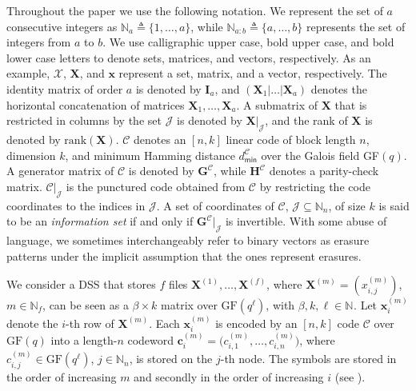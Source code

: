 \documentclass[twocolumn,conference]{IEEEtran}
\newcommand{\X}{\bm X}
\newcommand{\set}[1]{\mathcal{#1}}           %
\newcommand{\mat}[1]{\bm{#1}}                %
\newcommand{\vect}[1]{\bm{#1}}               %
\newcommand{\GF}{\mathrm{GF}}                %
\newcommand{\Nat}[1]{\mathbb{N}_{#1}}        %
\newcommand{\code}[1]{\mathcal{#1}}          %
\newcommand{\rank}[1]{\mathrm{rank}\left(#1\right)} %
\begin{document}
Throughout the paper we use the following notation. We represent the set of $a$ consecutive integers as $\Nat{a}\triangleq\{1,\ldots,a\}$, while $\Nat{a:b}\triangleq\{a,\ldots,b\}$ represents the set of integers from $a$ to $b$. We use calligraphic upper case, bold upper case, and bold lower case letters to denote sets, matrices, and vectors, respectively.  As an example, $\mathcal X$, $\bm X$, and $\bm x$ represent a set, matrix, and a vector, respectively. The identity matrix of order $a$ is denoted by $\bm I_a$, and  %
$(\bm X_1|\ldots|\bm X_a)$ denotes the horizontal concatenation of matrices $\bm X_1,\ldots,\bm X_a$.
A submatrix of $\bm X$ that is restricted in columns by the set $\mathcal J$ is denoted by $\bm X|_{\mathcal J}$, and the rank of $\bm X$ is denoted by $\rank{\bm X}$. $\mathcal C$ denotes an $[n,k]$ linear code of block length $n$, dimension $k$, and minimum Hamming distance $d_{\mathsf{min}}^{\mathcal C}$  over the Galois field GF$(q)$. A generator matrix of $\mathcal C$ is denoted by $\bm G^{\mathcal{C}}$, while $\bm H^{\mathcal{C}}$ denotes a parity-check matrix. $\mathcal C|_{\mathcal J}$ is the punctured code obtained from $\mathcal C$ by restricting the code coordinates to the indices in $\mathcal J$.  %
A set of coordinates of $\mathcal{C}$, $\set{J}\subseteq\Nat{n}$, of size $k$ is said to be an \emph{information set} if and
only if $\mat{G}^\code{C}|_\set{J}$ is invertible. With some abuse of language, we sometimes interchangeably refer to binary vectors as erasure patterns under the implicit assumption that the ones represent erasures.
%



We consider a DSS that stores $f$ files $\bm X^{(1)},\ldots, \bm X^{(f)}$, where 
$\bm{X}^{(m)}=(x_{i,j}^{(m)})$, $m\in\Nat{f}$, can be seen as a $\beta \times k$ matrix over $\GF(q^\ell)$,
with $\beta, k, \ell\in\Nat{}$. Let $\bm x^{(m)}_i$ denote the $i$-th row of $\X^{(m)}$. Each $\bm x_i^{(m)}$ is encoded by an $[n,k]$ code $\mathcal{C}$ over
$\GF(q)$ into a length-$n$ codeword
$\bm c^{(m)}_i=\bigl(c^{(m)}_{i,1},\ldots,c^{(m)}_{i,n}\bigr)$, where $c_{i,j}^{(m)}\in\GF(q^\ell)$, $j\in\Nat{n}$, is stored on the $j$-th node. The symbols are stored in the order of increasing $m$ and secondly in the order of increasing $i$ (see \cite[Sec.~III]{KumarLinRosnesGraell17_1sub}).
\end{document}
